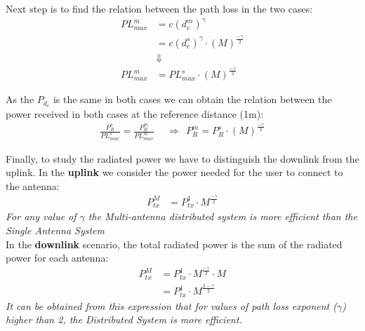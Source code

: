 Next step is to find the relation between the path loss in the two cases:
\begin{align}
PL^m_{max} &= c(d^m_c) ^{\gamma} \\
	&= c(d^s_c)^{\gamma}\cdot (M)^{\frac{-\gamma}{2}}\\ %
&\Downarrow\\	
	PL^m_{max} &= PL^s_{max} \cdot (M)^{\frac{-\gamma}{2}} \label{eq:probc1}
\end{align}

As the $P_{d_{c}}$ is the same in both cases we can obtain the relation between the power received in both cases at the reference distance (1m):
\begin{align*}
\frac{P^s_R}{PL^s_{max}}=\frac{P^m_R}{PL^m_{max}}\ \ &\Longrightarrow \ \ P^m_R = P^s_R \cdot (M)^{\frac{-\gamma}{2}}
\end{align*}

Finally, to study the radiated power we have to distinguish the downlink from the uplink. In the \textbf{uplink} we consider the power needed for the user to connect to the antenna:
\begin{align*}
P^M_{tx} &= P^1_{tx} \cdot M^{\frac{-\gamma}{2}}
\end{align*}
\textit{For any value of $\gamma$ the Multi-antenna distributed system is more efficient than the Single Antenna System}\\

In the \textbf{downlink} scenario, the total radiated power is the sum of the radiated power for each antenna:
\begin{align*}
P^M_{tx} &= P^1_{tx} \cdot M^{\frac{-\gamma}{2}} \cdot M\\
&=P^1_{tx} \cdot M^{\frac{2-\gamma}{2}}
\end{align*}
\textit{It can be obtained from this expression that for values of path loss exponent ($\gamma$) higher than 2, the Distributed System is more efficient.}